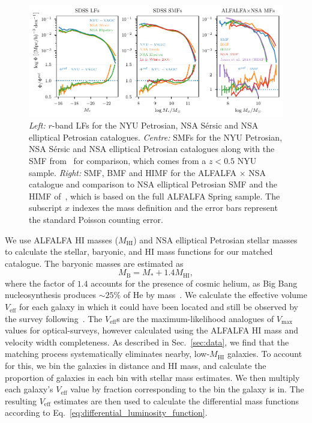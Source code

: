 \documentclass[usenatbib,useAMS]{mnras}
\newcommand{\HI}{\ensuremath{\mathrm{H}\scriptstyle\mathrm{I}}}
\newcommand{\Veff}{\ensuremath{V_{\mathrm{eff}}}}
\newcommand{\matched}{ALFALFA $\times$ NSA }
\begin{document}
% 
\begin{figure}
    \centering
    \includegraphics[width=1.0\textwidth]{Figures/LFs_MFs.pdf}
    \caption{
    \emph{Left:} $r$-band \aclp{LF} for the \ac{NYU} Petrosian, \ac{NSA} S\'ersic and \ac{NSA} elliptical Petrosian catalogues. \emph{Centre:} \aclp{SMF} for the \ac{NYU} Petrosian, \ac{NSA} S\'ersic and \ac{NSA} elliptical Petrosian catalogues along with the \ac{SMF} from~\citet{Li2009} for comparison, which comes from a $z < 0.5$ \ac{NYU} sample. \emph{Right:} \acl{SMF}, \acl{BMF} and \acl{HIMF} for the \matched catalogue and comparison to \ac{NSA} elliptical Petrosian \ac{SMF} and the \ac{HIMF} of~\citet{Jones2018}, which is based on the full ALFALFA Spring sample. The subscript $x$ indexes the mass definition and the error bars represent the standard Poisson counting error.}
    \label{fig:LFs_MFs}
\end{figure}
% 

We use ALFALFA $\HI$ masses ($M_{\HI}$) and \ac{NSA} elliptical Petrosian stellar masses to calculate the stellar, baryonic, and $\HI$ mass functions for our matched catalogue. The baryonic masses are estimated as
% 
\begin{equation}\label{eq:baryonic_mass}
    M_{\mathrm{B}} = M_* + 1.4 M_{\HI},
\end{equation}
% 
where the factor of $1.4$ accounts for the presence of cosmic helium, as Big Bang nucleosynthesis produces $\sim 25\%$ of He by mass~\citep{Nucleosynthesis}. We calculate the effective volume $\Veff$ for each galaxy in which it could have been located and still be observed by the survey following~\citet{Zwaan}. The $\Veff$s are the maximum-likelihood analogues of $V_{\max}$ values for optical-surveys, however calculated using the ALFALFA $\HI$ mass and velocity width completeness. As described in Sec.~\ref{sec:data}, we find that the matching process systematically eliminates nearby, low-$M_{\HI}$ galaxies. To account for this, we bin the galaxies in distance and $\HI$ mass, and calculate the proportion of galaxies in each bin with stellar mass estimates. We then multiply each galaxy's $\Veff$ value by fraction corresponding to the bin the galaxy is in. The resulting $\Veff$ estimates are then used to calculate the differential mass functions according to Eq.~\eqref{eq:differential_luminosity_function}.
\end{document}
